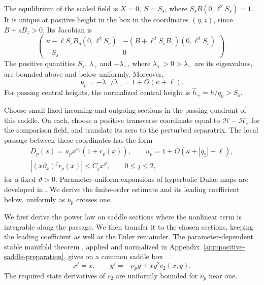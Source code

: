 The equilibrium of the scaled field is \(X=0,\ S=S_s\), where
\(S_sB(0,\ell^2S_s)=1\). It is unique at positive height
in the box in the coordinates \((\eta,z)\), since \(B+zB_z>0\).
Its Jacobian is
\[
 \begin{pmatrix}
 \kappa-\ell S_sB_\eta(0,\ell^2S_s)&
       -(B+\ell^2S_sB_z)(0,\ell^2S_s)\\
 -S_s&0
 \end{pmatrix}.
\]
The positive quantities \(S_s\), \(\lambda_+\) and \(-\lambda_-\), where
\(\lambda_+>0>\lambda_-\) are its eigenvalues, are bounded
above and below uniformly. Moreover,
\begin{equation}
\label{eq:direct-positive-saddle-ratio}
 \nu_p=-\lambda_-/\lambda_+=1+O(\kappa+\ell).
\end{equation}
For passing central heights, the normalized central height is
\(\widehat h_+=h/q_0>S_s\).

Choose small fixed incoming and outgoing sections in the passing
quadrant of this saddle. On each, choose a positive transverse
coordinate equal to \(\mathscr H-\mathscr H_s\) for the comparison
field, and translate its zero to the perturbed separatrix. The
local passage between these coordinates has the form
\begin{equation}
\label{eq:direct-positive-dulac}
 \begin{gathered}
 D_p(x)=u_px^{\nu_p}(1+r_p(x)),\qquad
 u_p=1+O(\kappa+|q_2|+\ell),\\
 |(x\partial_x)^jr_p(x)|\le C_jx^\vartheta,
 \qquad 0\le j\le2,
 \end{gathered}
\end{equation}
for a fixed \(\vartheta>0\). Parameter-uniform expansions of
hyperbolic Dulac maps are developed in \cite{MV2024}. We derive the
finite-order estimate and its leading coefficient below, uniformly as
\(\nu_p\) crosses one.

We first derive the power law on saddle sections where the nonlinear
term is integrable along the passage. We then transfer it to the
chosen sections, keeping the leading coefficient as well as the
Euler remainder.
The parameter-dependent stable manifold theorem
\cite[Theorem~9.6]{Teschl2012}, applied and normalized in
Appendix~\ref{app:positive-saddle-preparation}, gives on a common
saddle box
\begin{equation}
\label{eq:direct-positive-saddle-preparation}
 x'=x,\qquad y'=-\nu_p y+xy^2c_2(x,y).
\end{equation}
The required state derivatives of \(c_2\) are uniformly bounded
for \(\nu_p\) near one.

